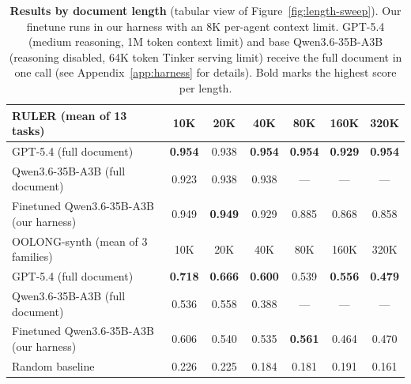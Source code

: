 \begin{table}[H]
\centering\small
\begin{tabular}{@{}lcccccc@{}}
\toprule
RULER (mean of 13 tasks) & 10K & 20K & 40K & 80K & 160K & 320K \\
\midrule
GPT-5.4 (full document)                & \textbf{0.954} & 0.938 & \textbf{0.954} & \textbf{0.954} & \textbf{0.929} & \textbf{0.954} \\
Qwen3.6-35B-A3B (full document)        & 0.923 & 0.938 & 0.938 & ---   & ---   & --- \\
Finetuned Qwen3.6-35B-A3B (our harness)             & 0.949 & \textbf{0.949} & 0.929 & 0.885 & 0.868 & 0.858 \\
\midrule
OOLONG-synth (mean of 3 families) & 10K & 20K & 40K & 80K & 160K & 320K \\
\midrule
GPT-5.4 (full document)                & \textbf{0.718} & \textbf{0.666} & \textbf{0.600} & 0.539 & \textbf{0.556} & \textbf{0.479} \\
Qwen3.6-35B-A3B (full document)        & 0.536 & 0.558 & 0.388 & ---   & ---   & --- \\
Finetuned Qwen3.6-35B-A3B (our harness)             & 0.606 & 0.540 & 0.535 & \textbf{0.561} & 0.464 & 0.470 \\
Random baseline                        & 0.226 & 0.225 & 0.184 & 0.181 & 0.191 & 0.161 \\
\bottomrule
\end{tabular}
\caption{\textbf{Results by document length} (tabular view of Figure~\ref{fig:length-sweep}). Our finetune runs in our harness with an 8K per-agent context limit. GPT-5.4 (medium reasoning, 1M token context limit) and base Qwen3.6-35B-A3B (reasoning disabled, 64K token Tinker serving limit) receive the full document in one call (see Appendix~\ref{app:harness} for details). Bold marks the highest score per length.}
\label{tab:comparison}
\end{table}
